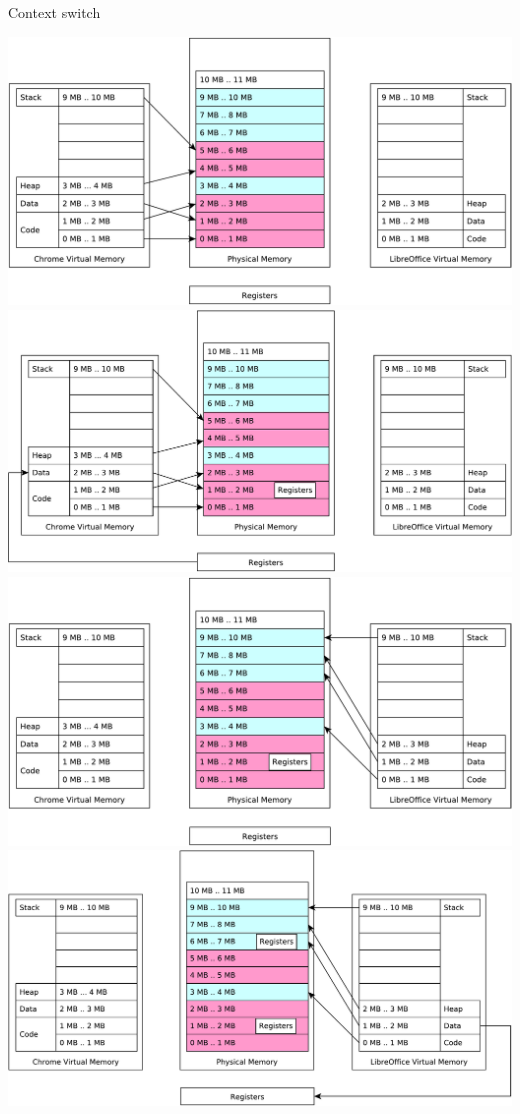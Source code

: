 \documentclass{beamer}
\begin{document}
\begin{frame}{Context switch}
  \begin{center}
     {
  \includegraphics[width=0.9\linewidth]{ctx1}
}
     {
  \includegraphics[width=0.9\linewidth]{ctx2}
}
     {
  \includegraphics[width=0.9\linewidth]{ctx3}
}
     {
  \includegraphics[width=0.9\linewidth]{ctx4}
}
  \end{center}
\end{frame}
\end{document}
